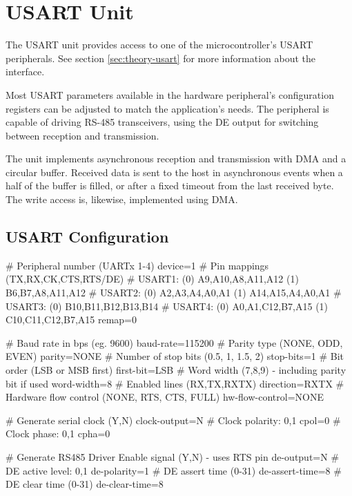 \section{USART Unit}

The \gls{USART} unit provides access to one of the microcontroller's \gls{USART} peripherals. See section \ref{sec:theory-usart} for more information about the interface.

Most \gls{USART} parameters available in the hardware peripheral's configuration registers can be adjusted to match the application's needs. The peripheral is capable of driving RS-485 transceivers, using the \gls{DE} output for switching between reception and transmission.

The unit implements asynchronous reception and transmission with \gls{DMA} and a circular buffer. Received data is sent to the host in asynchronous events when a half of the buffer is filled, or after a fixed timeout from the last received byte. The write access is, likewise, implemented using \gls{DMA}.


\subsection{USART Configuration}

\begin{inicode}
# Peripheral number (UARTx 1-4)
device=1
# Pin mappings (TX,RX,CK,CTS,RTS/DE)
#  USART1: (0) A9,A10,A8,A11,A12   (1) B6,B7,A8,A11,A12
#  USART2: (0) A2,A3,A4,A0,A1      (1) A14,A15,A4,A0,A1
#  USART3: (0) B10,B11,B12,B13,B14
#  USART4: (0) A0,A1,C12,B7,A15    (1) C10,C11,C12,B7,A15
remap=0

# Baud rate in bps (eg. 9600)
baud-rate=115200
# Parity type (NONE, ODD, EVEN)
parity=NONE
# Number of stop bits (0.5, 1, 1.5, 2)
stop-bits=1
# Bit order (LSB or MSB first)
first-bit=LSB
# Word width (7,8,9) - including parity bit if used
word-width=8
# Enabled lines (RX,TX,RXTX)
direction=RXTX
# Hardware flow control (NONE, RTS, CTS, FULL)
hw-flow-control=NONE

# Generate serial clock (Y,N)
clock-output=N
# Clock polarity: 0,1
cpol=0
# Clock phase: 0,1
cpha=0

# Generate RS485 Driver Enable signal (Y,N) - uses RTS pin
de-output=N
# DE active level: 0,1
de-polarity=1
# DE assert time (0-31)
de-assert-time=8
# DE clear time (0-31)
de-clear-time=8
\end{inicode}


